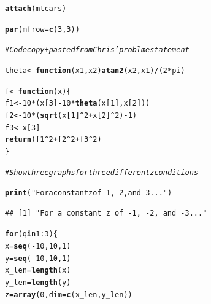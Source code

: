 \documentclass{article}\usepackage[]{graphicx}\usepackage[]{color}
\makeatletter
\newcommand{\hlnum}[1]{\textcolor[rgb]{0.686,0.059,0.569}{#1}}%
\newcommand{\hlstr}[1]{\textcolor[rgb]{0.192,0.494,0.8}{#1}}%
\newcommand{\hlcom}[1]{\textcolor[rgb]{0.678,0.584,0.686}{\textit{#1}}}%
\newcommand{\hlopt}[1]{\textcolor[rgb]{0,0,0}{#1}}%
\newcommand{\hlstd}[1]{\textcolor[rgb]{0.345,0.345,0.345}{#1}}%
\newcommand{\hlkwa}[1]{\textcolor[rgb]{0.161,0.373,0.58}{\textbf{#1}}}%
\newcommand{\hlkwb}[1]{\textcolor[rgb]{0.69,0.353,0.396}{#1}}%
\newcommand{\hlkwc}[1]{\textcolor[rgb]{0.333,0.667,0.333}{#1}}%
\newcommand{\hlkwd}[1]{\textcolor[rgb]{0.737,0.353,0.396}{\textbf{#1}}}%
\newenvironment{kframe}{%
 \def\at@end@of@kframe{}%
 \ifinner\ifhmode%
  \def\at@end@of@kframe{\end{minipage}}%
  \begin{minipage}{\columnwidth}%
 \fi\fi%
 \def\FrameCommand##1{\hskip\@totalleftmargin \hskip-\fboxsep
 \colorbox{shadecolor}{##1}\hskip-\fboxsep
     \hskip-\linewidth \hskip-\@totalleftmargin \hskip\columnwidth}%
 \MakeFramed {\advance\hsize-\width
   \@totalleftmargin\z@ \linewidth\hsize
   \@setminipage}}%
 {\par\unskip\endMakeFramed%
 \at@end@of@kframe}
\newenvironment{knitrout}{}{} %
\makeatother
\begin{document}
\begin{knitrout}
\color{fgcolor}\begin{kframe}
\begin{alltt}
\hlkwd{attach}\hlstd{(mtcars)}
\end{alltt}


{\ttfamily\noindent\itshape\color{messagecolor}{\#\# The following objects are masked from mtcars (pos = 3):\\\#\# \\\#\#\ \ \ \  am, carb, cyl, disp, drat, gear, hp, mpg, qsec, vs, wt}}\begin{alltt}
\hlkwd{par}\hlstd{(}\hlkwc{mfrow}\hlstd{=}\hlkwd{c}\hlstd{(}\hlnum{3}\hlstd{,}\hlnum{3}\hlstd{))}

\hlcom{# Code copy + pasted from Chris' problme statement}

\hlstd{theta} \hlkwb{<-} \hlkwa{function}\hlstd{(}\hlkwc{x1}\hlstd{,}\hlkwc{x2}\hlstd{)} \hlkwd{atan2}\hlstd{(x2, x1)}\hlopt{/}\hlstd{(}\hlnum{2}\hlopt{*}\hlstd{pi)}

\hlstd{f} \hlkwb{<-} \hlkwa{function}\hlstd{(}\hlkwc{x}\hlstd{) \{}
  \hlstd{f1} \hlkwb{<-} \hlnum{10}\hlopt{*}\hlstd{(x[}\hlnum{3}\hlstd{]} \hlopt{-} \hlnum{10}\hlopt{*}\hlkwd{theta}\hlstd{(x[}\hlnum{1}\hlstd{],x[}\hlnum{2}\hlstd{]))}
  \hlstd{f2} \hlkwb{<-} \hlnum{10}\hlopt{*}\hlstd{(}\hlkwd{sqrt}\hlstd{(x[}\hlnum{1}\hlstd{]}\hlopt{^}\hlnum{2}\hlopt{+}\hlstd{x[}\hlnum{2}\hlstd{]}\hlopt{^}\hlnum{2}\hlstd{)}\hlopt{-}\hlnum{1}\hlstd{)}
  \hlstd{f3} \hlkwb{<-} \hlstd{x[}\hlnum{3}\hlstd{]}
  \hlkwd{return}\hlstd{(f1}\hlopt{^}\hlnum{2}\hlopt{+}\hlstd{f2}\hlopt{^}\hlnum{2}\hlopt{+}\hlstd{f3}\hlopt{^}\hlnum{2}\hlstd{)}
\hlstd{\}}

\hlcom{# Show three graphs for three different z conditions}

\hlkwd{print}\hlstd{(}\hlstr{"For a constant z of -1, -2, and -3..."}\hlstd{)}
\end{alltt}
\begin{verbatim}
## [1] "For a constant z of -1, -2, and -3..."
\end{verbatim}
\begin{alltt}
\hlkwa{for} \hlstd{(q} \hlkwa{in} \hlnum{1}\hlopt{:}\hlnum{3}\hlstd{) \{}
    \hlstd{x}\hlkwb{=}\hlkwd{seq}\hlstd{(}\hlopt{-}\hlnum{10}\hlstd{,}\hlnum{10}\hlstd{,}\hlnum{1}\hlstd{)}
    \hlstd{y}\hlkwb{=}\hlkwd{seq}\hlstd{(}\hlopt{-}\hlnum{10}\hlstd{,}\hlnum{10}\hlstd{,}\hlnum{1}\hlstd{)}
    \hlstd{x_len}\hlkwb{=} \hlkwd{length}\hlstd{(x)}
    \hlstd{y_len} \hlkwb{=} \hlkwd{length}\hlstd{(y)}
    \hlstd{z}\hlkwb{=}\hlkwd{array}\hlstd{(}\hlnum{0}\hlstd{,}\hlkwc{dim}\hlstd{=}\hlkwd{c}\hlstd{(x_len,y_len))}


\end{alltt}
\end{kframe}
\end{knitrout}
\end{document}
